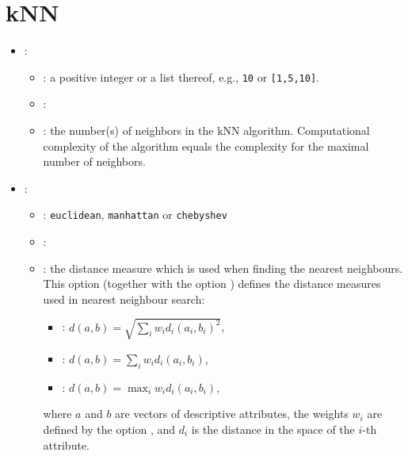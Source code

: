 \section{kNN}


\begin{itemize}
    \item {}:
    \begin{itemize}
        \item \optionPossibleValues{}: a positive integer or a list thereof, e.g., \texttt{10} or \texttt{[1,5,10]}.
        \item \optionDefaultValue{}: \optionDefaultValueStyle{[1,3]}
        \item \optionDescrption{}: the number(s) of neighbors in the kNN algorithm. Computational complexity of the algorithm equals
        the complexity for the maximal number of neighbors.
    \end{itemize}
    \item {}:
    \begin{itemize}
        \item \optionPossibleValues{}: \texttt{euclidean}, \texttt{manhattan} or \texttt{chebyshev}
        \item \optionDefaultValue{}: 
        \item \optionDescrption{}: the distance measure which is used when finding the nearest neighbours.        
        This option (together with the option ) defines the distance measures used in nearest neighbour search:
        \begin{itemize}
            \item {}: $d(a, b) = \sqrt{\sum_i w_i d_i(a_i, b_i)^2}$,
            \item {}: $d(a, b) = \sum_i w_i d_i(a_i, b_i)$,
            \item {}: $d(a, b) = \max_i w_i d_i(a_i, b_i)$,
        \end{itemize}
        where $a$ and $b$ are vectors of descriptive attributes, the weights $w_i$ are defined by the option ,
        and $d_i$ is the distance in the space of the $i$-th attribute.
        

\end{itemize}
\end{itemize}
